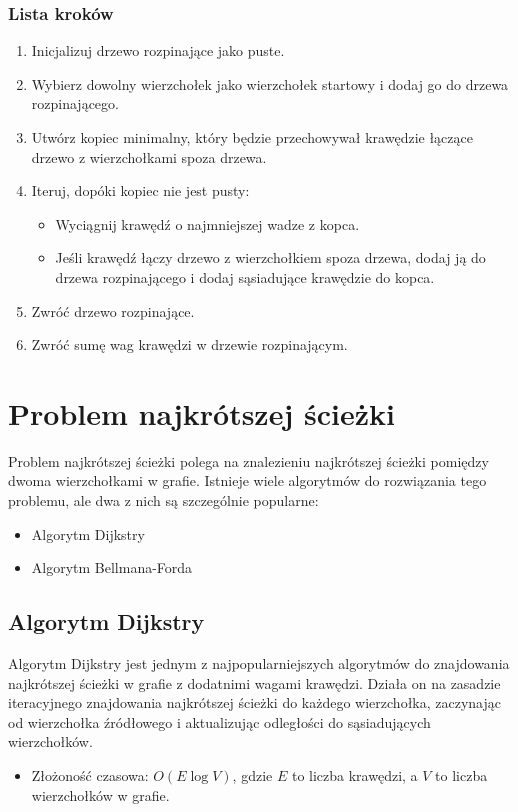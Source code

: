\documentclass{article}
\begin{document}
\subsubsection{Lista kroków}
\begin{enumerate}
    \item Inicjalizuj drzewo rozpinające jako puste.
    \item Wybierz dowolny wierzchołek jako wierzchołek startowy i dodaj go do drzewa rozpinającego.
    \item Utwórz kopiec minimalny, który będzie przechowywał krawędzie łączące drzewo z wierzchołkami spoza drzewa.
    \item Iteruj, dopóki kopiec nie jest pusty:
    \begin{itemize}
        \item Wyciągnij krawędź o najmniejszej wadze z kopca.
        \item Jeśli krawędź łączy drzewo z wierzchołkiem spoza drzewa, dodaj ją do drzewa rozpinającego i dodaj sąsiadujące krawędzie do kopca.
    \end{itemize}
    \item Zwróć drzewo rozpinające.
    \item Zwróć sumę wag krawędzi w drzewie rozpinającym.
\end{enumerate}

\section{Problem najkrótszej ścieżki}

Problem najkrótszej ścieżki polega na znalezieniu najkrótszej ścieżki pomiędzy dwoma wierzchołkami w grafie. Istnieje wiele algorytmów do rozwiązania tego problemu, ale dwa z nich są szczególnie popularne:
\begin{itemize}
    \item Algorytm Dijkstry
    \item Algorytm Bellmana-Forda
\end{itemize}

\subsection{Algorytm Dijkstry}

Algorytm Dijkstry jest jednym z najpopularniejszych algorytmów do znajdowania najkrótszej ścieżki w grafie z dodatnimi wagami krawędzi.
Działa on na zasadzie iteracyjnego znajdowania najkrótszej ścieżki do każdego wierzchołka, zaczynając od wierzchołka źródłowego i aktualizując odległości do sąsiadujących wierzchołków.
\begin{itemize}
    \item Złożoność czasowa: $O(E \log V)$, gdzie $E$ to liczba krawędzi, a $V$ to liczba wierzchołków w grafie.
\end{itemize}
\end{document}
